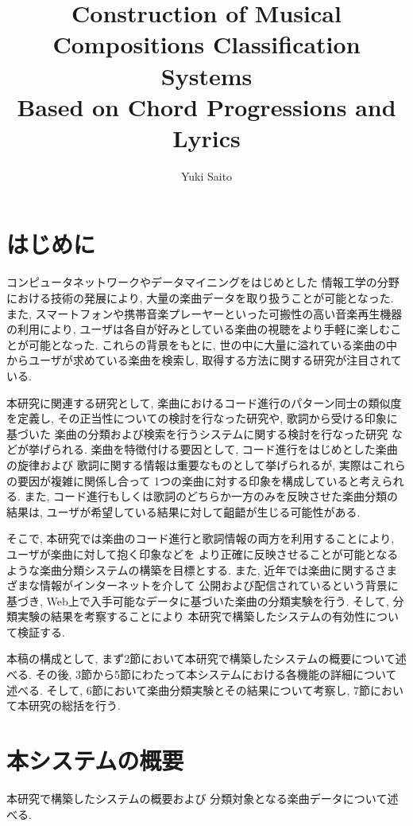 \documentclass{jpreprint}
\title{
Construction of Musical Compositions Classification Systems \\
Based on Chord Progressions and Lyrics
}
\author{Yuki Saito}
\begin{document}
\maketitle

\begin{multicols}{2}
  
\section{はじめに}
コンピュータネットワークやデータマイニングをはじめとした
情報工学の分野における技術の発展により, 
大量の楽曲データを取り扱うことが可能となった.
また,
スマートフォンや携帯音楽プレーヤーといった可搬性の高い音楽再生機器の利用により,
ユーザは各自が好みとしている楽曲の視聴をより手軽に楽しむことが可能となった.
これらの背景をもとに,
世の中に大量に溢れている楽曲の中からユーザが求めている楽曲を検索し,
取得する方法に関する研究が注目されている.

本研究に関連する研究として,
楽曲におけるコード進行のパターン同士の類似度を定義し,
その正当性についての検討を行なった研究\cite{NGSW07}や,
歌詞から受ける印象に基づいた
楽曲の分類および検索を行うシステムに関する検討を行なった研究\cite{FNSW09}
などが挙げられる.
楽曲を特徴付ける要因として,
コード進行をはじめとした楽曲の旋律および
歌詞に関する情報は重要なものとして挙げられるが,
実際はこれらの要因が複雑に関係し合って
1つの楽曲に対する印象を構成していると考えられる.
また, 
コード進行もしくは歌詞のどちらか一方のみを反映させた楽曲分類の結果は,
ユーザが希望している結果に対して齟齬が生じる可能性がある.

そこで, 本研究では楽曲のコード進行と歌詞情報の両方を利用することにより,
ユーザが楽曲に対して抱く印象などを
より正確に反映させることが可能となるような楽曲分類システムの構築を目標とする.
また,
近年では楽曲に関するさまざまな情報がインターネットを介して
公開および配信されているという背景に基づき,
Web上で入手可能なデータに基づいた楽曲の分類実験を行う.
そして, 分類実験の結果を考察することにより
本研究で構築したシステムの有効性について検証する.

本稿の構成として,
まず2節において本研究で構築したシステムの概要について述べる.
その後,
3節から5節にわたって本システムにおける各機能の詳細について述べる.
そして,
6節において楽曲分類実験とその結果について考察し,
7節において本研究の総括を行う.

\section{本システムの概要}
本研究で構築したシステムの概要および
分類対象となる楽曲データについて述べる.

\end{multicols}
\end{document}
